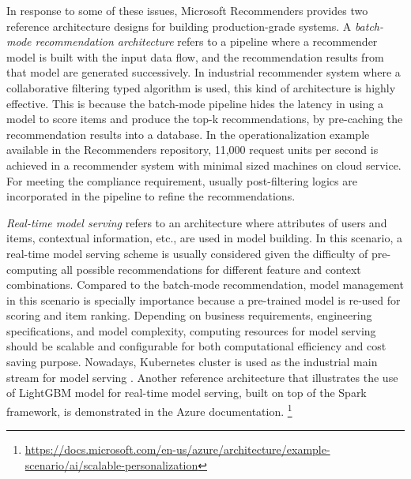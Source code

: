 %
In response to some of these issues, 
Microsoft Recommenders provides two reference architecture designs for building production-grade systems. 
A \textit{batch-mode recommendation architecture} refers to a pipeline where a recommender model is built with the input data flow, and the recommendation results from that model are generated successively. In industrial recommender system where a collaborative filtering typed algorithm is used, this kind of architecture is highly effective. This is because the batch-mode pipeline hides the latency in using a model to score items and produce the top-k recommendations, by pre-caching the recommendation results into a database. In the operationalization example available in the Recommenders repository, 11,000 request units per second is achieved in a recommender system with minimal sized machines on cloud service. 
For meeting the compliance requirement, usually post-filtering logics are incorporated in the pipeline to refine the recommendations.

\textit{Real-time model serving} refers to an architecture where attributes of users and items, contextual information, etc., are used in model building. In this scenario, a real-time model serving scheme is usually considered given the difficulty of pre-computing all possible recommendations for different feature and context combinations. Compared to the batch-mode recommendation, model management in this scenario is specially importance because a pre-trained model is re-used for scoring and item ranking. Depending on business requirements, engineering specifications, and model complexity, computing resources for model serving should be scalable and configurable for both computational efficiency and cost saving purpose. Nowadays, Kubernetes cluster is used as the industrial main stream for model serving \cite{bernstein2014containers}. Another reference architecture that illustrates the use of LightGBM model \cite{ke2017lightgbm} for real-time model serving, built on top of the Spark framework, is demonstrated in the Azure documentation. \footnote{\url{https://docs.microsoft.com/en-us/azure/architecture/example-scenario/ai/scalable-personalization}}
